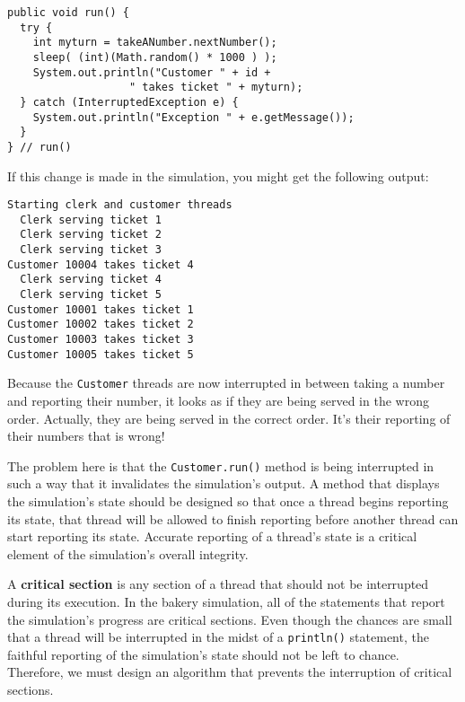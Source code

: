\begin{jjjlisting}
\begin{lstlisting}
public void run() {
  try {
    int myturn = takeANumber.nextNumber();
    sleep( (int)(Math.random() * 1000 ) );
    System.out.println("Customer " + id + 
                   " takes ticket " + myturn);
  } catch (InterruptedException e) {
    System.out.println("Exception " + e.getMessage());
  }
} // run()
\end{lstlisting}
\end{jjjlisting}

\noindent If this change is made in the simulation, you might get
the following output:


\begin{jjjlisting}
\begin{lstlisting}
Starting clerk and customer threads
  Clerk serving ticket 1
  Clerk serving ticket 2
  Clerk serving ticket 3
Customer 10004 takes ticket 4
  Clerk serving ticket 4
  Clerk serving ticket 5
Customer 10001 takes ticket 1
Customer 10002 takes ticket 2
Customer 10003 takes ticket 3
Customer 10005 takes ticket 5
\end{lstlisting}
\end{jjjlisting}

\noindent Because the {\tt Customer} threads are now interrupted
in between taking a number and reporting their number, it looks as if
they are being served in the wrong order.  Actually, they
are being served in the correct order.  It's their reporting of
their numbers that is wrong!

The problem here is that the {\tt Customer.run()} method is being
interrupted in such a way that it invalidates the simulation's output.
A method that displays the simulation's state should be designed so
that once a thread begins reporting its state, that thread will be
allowed to finish reporting before another thread can start reporting
its state.   Accurate \mbox{reporting} of a thread's state is a critical
element of the simulation's overall integrity.

A {\bf critical section} is any section of a thread that should not be
interrupted during its execution.  In the bakery simulation, all of the
statements that report the simulation's progress are critical
sections.  Even though the chances are small that a thread will be
interrupted in the midst of a {\tt println()} statement, the faithful
reporting of the simulation's state should not be left to
chance.  Therefore, we must design an algorithm that prevents the
interruption of critical sections.

